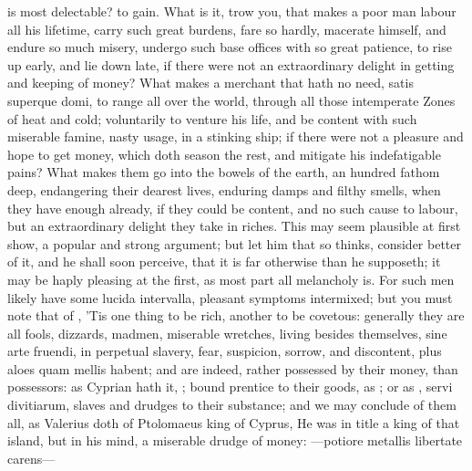 {{is most delectable? to gain. What is it, trow you, that makes a poor
man labour all his lifetime, carry such great burdens, fare so hardly,
macerate himself, and endure so much misery, undergo such base offices
with so great patience, to rise up early, and lie down late, if there
were not an extraordinary delight in getting and keeping of money? What
makes a merchant that hath no need, satis superque domi, to range all
over the world, through all those intemperate Zones of heat and
cold; voluntarily to venture his life, and be content with such
miserable famine, nasty usage, in a stinking ship; if there were not a
pleasure and hope to get money, which doth season the rest, and
mitigate his indefatigable pains? What makes them go into the bowels of
the earth, an hundred fathom deep, endangering their dearest lives,
enduring damps and filthy smells, when they have enough already, if
they could be content, and no such cause to labour, but an
extraordinary delight they take in riches. This may seem plausible at
first show, a popular and strong argument; but let him that so thinks,
consider better of it, and he shall soon perceive, that it is far
otherwise than he supposeth; it may be haply pleasing at the first, as
most part all melancholy is. For such men likely have some lucida
intervalla, pleasant symptoms intermixed; but you must note that of
\Chrysostom{}, 'Tis one thing to be rich, another to be covetous:
generally they are all fools, dizzards, madmen, miserable
wretches, living besides themselves, sine arte fruendi, in perpetual
slavery, fear, suspicion, sorrow, and discontent, plus aloes quam
mellis habent; and are indeed, rather possessed by their money, than
possessors: as Cyprian hath it, ; bound
prentice to their goods, as \Pliny{}; or as \Chrysostom{}, servi
divitiarum, slaves and drudges to their substance; and we may conclude
of them all, as Valerius doth of Ptolomaeus king of Cyprus, He
was in title a king of that island, but in his mind, a miserable drudge
of money:
---potiore metallis
libertate carens---

}}
